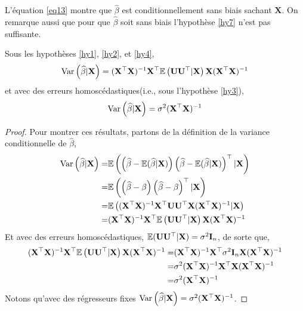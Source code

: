L'équation \eqref{eq13} montre que $\widehat{\beta}$ est conditionnellement sans biais sachant $\mathbf{X}$. On remarque aussi que pour que $\widehat{\beta}$ soit sans biais l'hypothèse \ref{hy7} n'est pas suffisante.
\begin{proposition}
Sous les hypothèses \ref{hy1}, \ref{hy2}, et \ref{hy4},
\begin{align*}
\mathrm{Var}\left(\widehat{\beta} | \mathbf{X}\right) = (\mathbf{X}^\top\mathbf{X})^{-1}\mathbf{X}^\top\mathbb{E}\left(\mathbf{U}\mathbf{U}^\top | \mathbf{X}\right)\mathbf{X}(\mathbf{X}^\top\mathbf{X})^{-1}
\end{align*}
et avec des erreurs homoscédastiques(i.e., sous l'hypothèse \ref{hy3}),
\begin{align*}
\mathrm{Var}\left(\widehat{\beta} | \mathbf{X}\right) = \sigma^2(\mathbf{X}^\top\mathbf{X})^{-1}
\end{align*}
\end{proposition}
\begin{proof}
Pour montrer ces résultats, partons de la définition de la variance conditionnelle de $\widehat{\beta}$,
\begin{align*}
\mathrm{Var}\left(\widehat{\beta} | \mathbf{X}\right) =& \mathbb{E}\left(\left(\widehat{\beta} - \mathbb{E}(\widehat{\beta} | \mathbf{X})\right) \left(\widehat{\beta} - \mathbb{E}(\widehat{\beta} | \mathbf{X})\right)^\top | \mathbf{X}\right)\\
=&\mathbb{E}\left(\left(\widehat{\beta} - \beta\right) \left(\widehat{\beta} - \beta\right) ^\top | \mathbf{X}\right)\\
=&\mathbb{E}\left((\mathbf{X}^\top\mathbf{X})^{-1}\mathbf{X}^\top\mathbf{U}\mathbf{U}^\top\mathbf{X}(\mathbf{X}^\top\mathbf{X})^{-1}|\mathbf{X}\right)\\
=&(\mathbf{X}^\top\mathbf{X})^{-1}\mathbf{X}^\top\mathbb{E}\left(\mathbf{U}\mathbf{U}^\top | \mathbf{X}\right)\mathbf{X}(\mathbf{X}^\top\mathbf{X})^{-1}
\end{align*}
Et avec des erreurs homoscédastiques, $\mathbb{E}(\mathbf{U}\mathbf{U}^\top| \mathbf{X}) = \sigma^2\mathbf{I}_n$, de sorte que,
\begin{align*}
(\mathbf{X}^\top\mathbf{X})^{-1}\mathbf{X}^\top\mathbb{E}\left(\mathbf{U}\mathbf{U}^\top | \mathbf{X}\right)\mathbf{X}(\mathbf{X}^\top\mathbf{X})^{-1} =& (\mathbf{X}^\top\mathbf{X})^{-1}\mathbf{X}^\top \sigma^2\mathbf{I}_n \mathbf{X}(\mathbf{X}^\top\mathbf{X})^{-1}\\
=& \sigma^2(\mathbf{X}^\top\mathbf{X})^{-1}\mathbf{X}^\top\mathbf{X}(\mathbf{X}^\top\mathbf{X})^{-1}\\
=&\sigma^2(\mathbf{X}^\top\mathbf{X})^{-1}
\end{align*}
Notons qu'avec des régresseurs fixes $\mathrm{Var}\left(\widehat{\beta} | \mathbf{X}\right) =  \sigma^2(\mathbf{X}^\top\mathbf{X})^{-1}$.
\end{proof}
